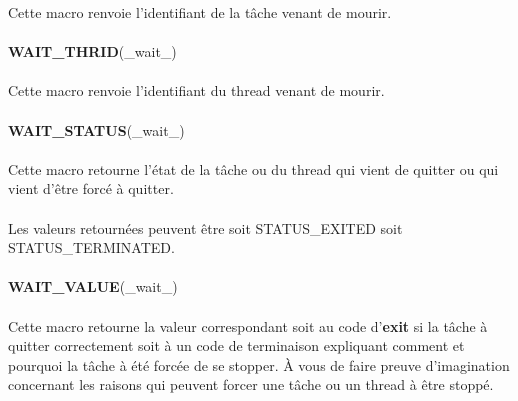 \documentclass[10pt,a4wide]{article}
\begin{document}
Cette macro renvoie l'identifiant de la t\^ache venant de mourir.

\paragraph{}

\hspace{1.5cm}\textbf{WAIT\_THRID}(\_wait\_)

\paragraph{}

Cette macro renvoie l'identifiant du thread venant de mourir.

\paragraph{}

\hspace{1.5cm}\textbf{WAIT\_STATUS}(\_wait\_)

\paragraph{}

Cette macro retourne l'\'etat de la t\^ache ou du thread qui vient de
quitter ou qui vient d'\^etre forc\'e \`a quitter.

\paragraph{}

Les valeurs retourn\'ees peuvent \^etre soit STATUS\_EXITED
soit STATUS\_TERMINATED.

\paragraph{}

\hspace{1.5cm}\textbf{WAIT\_VALUE}(\_wait\_)

\paragraph{}

Cette macro retourne la valeur correspondant soit au code d'\textbf{exit}
si la t\^ache \`a quitter correctement soit \`a un code de terminaison
expliquant comment et pourquoi la t\^ache \`a \'et\'e forc\'ee de se stopper.
\`A vous de faire preuve d'imagination concernant les raisons qui peuvent
forcer une t\^ache ou un thread \`a \^etre stopp\'e.
\end{document}
